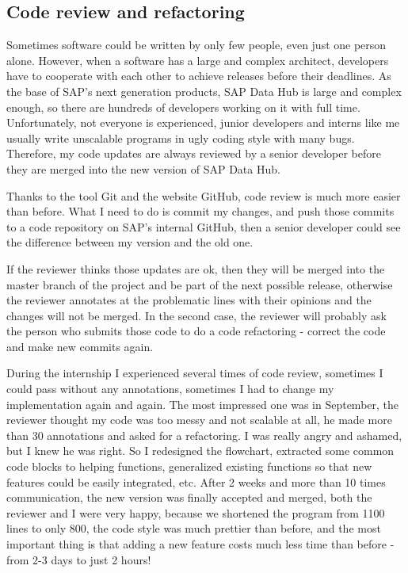 \documentclass[article,colorback,accentcolor=tud4c]{tudreport}
\begin{document}
	\subsection{Code review and refactoring}
	
	Sometimes software could be written by only few people, even just one person alone. However, when a software has a large and complex architect, developers have to cooperate with each other to achieve releases before their deadlines. As the base of SAP's next generation products, SAP Data Hub is large and complex enough, so there are hundreds of developers working on it with full time. Unfortunately, not everyone is experienced, junior developers and interns like me usually write unscalable programs in ugly coding style with many bugs. Therefore, my code updates are always reviewed by a senior developer before they are merged into the new version of SAP Data Hub.
	
	Thanks to the tool Git and the website GitHub, code review is much more easier than before. What I need to do is commit my changes, and push those commits to a code repository on SAP's internal GitHub, then a senior developer could see the difference between my version and the old one.
	
	If the reviewer thinks those updates are ok, then they will be merged into the master branch of the project and be part of the next possible release, otherwise the reviewer annotates at the problematic lines with their opinions and the changes will not be merged. In the second case, the reviewer will probably ask the person who submits those code to do a code refactoring - correct the code and make new commits again.
	
	During the internship I experienced several times of code review, sometimes I could pass without any annotations, sometimes I had to change my implementation again and again. The most impressed one was in September, the reviewer thought my code was too messy and not scalable at all, he made more than 30 annotations and asked for a refactoring. I was really angry and ashamed, but I knew he was right. So I redesigned the flowchart, extracted some common code blocks to helping functions, generalized existing functions so that new features could be easily integrated, etc. After 2 weeks and more than 10 times communication, the new version was finally accepted and merged, both the reviewer and I were very happy, because we shortened the program from 1100 lines to only 800, the code style was much prettier than before, and the most important thing is that adding a new feature costs much less time than before - from 2-3 days to just 2 hours!
	
\end{document}
